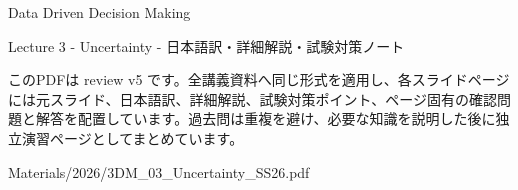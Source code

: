 \documentclass[a4paper,landscape,9pt]{article}
\begin{document}
\begin{titlepage}
\centering
\vspace*{2cm}
{\Huge Data Driven Decision Making\par}
\vspace{0.5cm}
{\Large Lecture 3 - Uncertainty - 日本語訳・詳細解説・試験対策ノート\par}
\vspace{1cm}
\begin{minipage}{0.82\textwidth}
このPDFは review v5 です。全講義資料へ同じ形式を適用し、各スライドページには元スライド、日本語訳、詳細解説、試験対策ポイント、ページ固有の確認問題と解答を配置しています。過去問は重複を避け、必要な知識を説明した後に独立演習ページとしてまとめています。
\end{minipage}
\vfill
{\large Materials/2026/3DM\_03\_Uncertainty\_SS26.pdf}
\end{titlepage}
\tableofcontents
\clearpage

\end{document}
